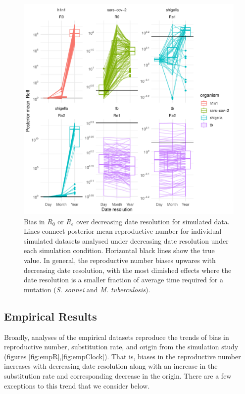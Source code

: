 \documentclass{article}
\begin{document}
\begin{spacing}{1.5}
\begin{figure}
    \centering
    \includegraphics{sim_Re_trajectory.pdf}
    \caption{Bias in $R_0$ or $R_e$ over decreasing date resolution for simulated data. Lines connect posterior mean reproductive number for individual simulated datasets analysed under decreasing date resolution under each simulation condition. Horizontal black lines show the true value. In general, the reproductive number biases upwares with decreasing date resolution, with the most dimished effects where the date resolution is a smaller fraction of average time required for a mutation (\textit{S. sonnei} and \textit{M. tuberculosis}).}
    \label{fig:simR0}
\end{figure}

\subsection*{Empirical Results}
Broadly, analyses of the empirical datasets reproduce the trends of bias in reproductive number, substitution rate, and origin from the simulation study (figures \ref{fig:empR},\ref{fig:empClock}). That is, biases in the reproductive number increases with decreasing date resolution along with an increase in the substitution rate and corresponding decrease in the origin. There are a few exceptions to this trend that we consider below.


\end{spacing}
\end{document}
